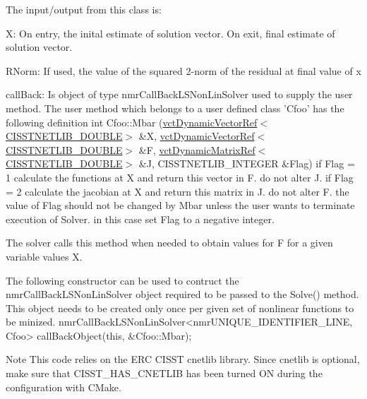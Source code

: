 The input/output from this class is\-:
\begin{DoxyItemize}
\item X\-: On entry, the inital estimate of solution vector. On exit, final estimate of solution vector.
\item R\-Norm\-: If used, the value of the squared 2-\/norm of the residual at final value of x
\item call\-Back\-: Is object of type nmr\-Call\-Back\-L\-S\-Non\-Lin\-Solver used to supply the user method. The user method which belongs to a user defined class 'Cfoo' has the following definition int Cfoo\-::\-Mbar (\hyperlink{classvct_dynamic_vector_ref}{vct\-Dynamic\-Vector\-Ref$<$\-C\-I\-S\-S\-T\-N\-E\-T\-L\-I\-B\-\_\-\-D\-O\-U\-B\-L\-E$>$} \&X, \hyperlink{classvct_dynamic_vector_ref}{vct\-Dynamic\-Vector\-Ref$<$\-C\-I\-S\-S\-T\-N\-E\-T\-L\-I\-B\-\_\-\-D\-O\-U\-B\-L\-E$>$} \&F, \hyperlink{classvct_dynamic_matrix_ref}{vct\-Dynamic\-Matrix\-Ref$<$\-C\-I\-S\-S\-T\-N\-E\-T\-L\-I\-B\-\_\-\-D\-O\-U\-B\-L\-E$>$} \&J, C\-I\-S\-S\-T\-N\-E\-T\-L\-I\-B\-\_\-\-I\-N\-T\-E\-G\-E\-R \&Flag) if Flag = 1 calculate the functions at X and return this vector in F. do not alter J. if Flag = 2 calculate the jacobian at X and return this matrix in J. do not alter F. the value of Flag should not be changed by Mbar unless the user wants to terminate execution of Solver. in this case set Flag to a negative integer.
\end{DoxyItemize}

\begin{DoxyVerb}  The solver calls this method when needed to obtain values for F for
  a given variable values X.

  The following constructor can be used to contruct the nmrCallBackLSNonLinSolver object
  required to be passed to the Solve() method. This object needs to be created
  only once per given set of nonlinear functions to be minized.
      nmrCallBackLSNonLinSolver<nmrUNIQUE_IDENTIFIER_LINE, Cfoo> callBackObject(this, &Cfoo::Mbar);
\end{DoxyVerb}


\begin{DoxyNote}{Note}
This code relies on the E\-R\-C C\-I\-S\-S\-T cnetlib library. Since cnetlib is optional, make sure that C\-I\-S\-S\-T\-\_\-\-H\-A\-S\-\_\-\-C\-N\-E\-T\-L\-I\-B has been turned O\-N during the configuration with C\-Make. 
\end{DoxyNote}


